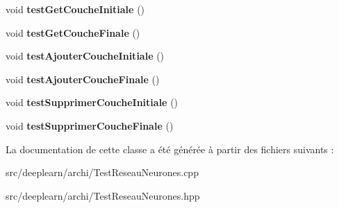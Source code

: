 \begin{DoxyCompactItemize}
\item 
\mbox{\label{classTestReseauNeurones_aaf72a0dbcbb46dbdbfb36fe61514d59d}} 
void {\bfseries test\+Get\+Couche\+Initiale} ()
\item 
\mbox{\label{classTestReseauNeurones_a9808a8c9c28f167845db1e6f57435bb3}} 
void {\bfseries test\+Get\+Couche\+Finale} ()
\item 
\mbox{\label{classTestReseauNeurones_a2aa4cdb205ead6f6275db97894c1be09}} 
void {\bfseries test\+Ajouter\+Couche\+Initiale} ()
\item 
\mbox{\label{classTestReseauNeurones_a2cc008d42aff3d270ae3e1f935fbf6b8}} 
void {\bfseries test\+Ajouter\+Couche\+Finale} ()
\item 
\mbox{\label{classTestReseauNeurones_a289a476c4f62458cb9ded841ea1b4148}} 
void {\bfseries test\+Supprimer\+Couche\+Initiale} ()
\item 
\mbox{\label{classTestReseauNeurones_a0e733607d7e5bbd48a3d6e5b62d5991f}} 
void {\bfseries test\+Supprimer\+Couche\+Finale} ()
\end{DoxyCompactItemize}


La documentation de cette classe a été générée à partir des fichiers suivants \+:\begin{DoxyCompactItemize}
\item 
src/deeplearn/archi/Test\+Reseau\+Neurones.\+cpp\item 
src/deeplearn/archi/Test\+Reseau\+Neurones.\+hpp\end{DoxyCompactItemize}
